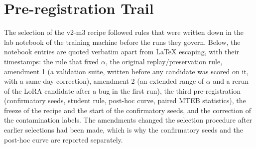 \documentclass[11pt]{article}
\begin{document}
{\small\setlength{\bibsep}{1pt}
}

\appendix
\section{Pre-registration Trail}\label{app:prereg}
The selection of the v2-m3 recipe followed rules that were written down in the lab notebook of the training machine before the runs they govern.
Below, the notebook entries are quoted verbatim apart from LaTeX escaping, with their timestamps: the rule that fixed $\alpha$, the original replay/preservation rule, amendment 1 (a validation suite, written before any candidate was scored on it, with a same-day correction), amendment 2 (an extended range of $\alpha$ and a rerun of the LoRA candidate after a bug in the first run), the third pre-registration (confirmatory seeds, student rule, post-hoc curve, paired MTEB statistics), the freeze of the recipe and the start of the confirmatory seeds, and the correction of the contamination labels.
The amendments changed the selection procedure after earlier selections had been made, which is why the confirmatory seeds and the post-hoc curve are reported separately.

\end{document}

